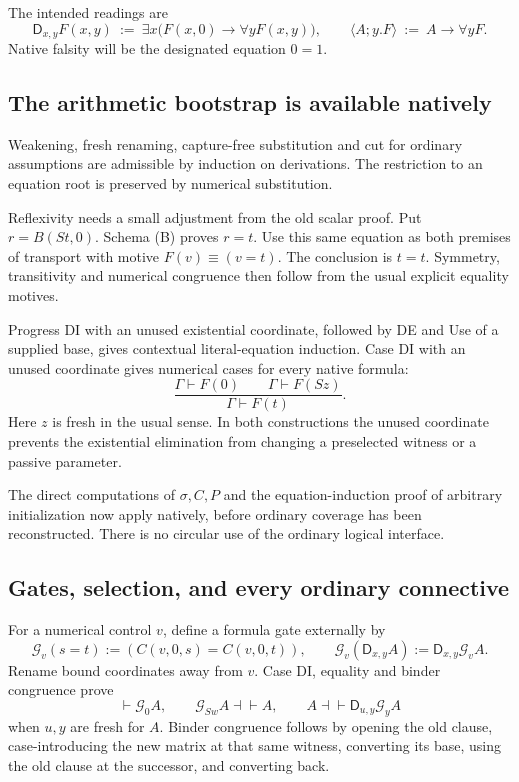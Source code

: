 \documentclass[11pt]{article}
\theoremstyle{definition}
\newcommand{\D}{\mathsf D}
\newcommand{\G}{\mathcal G}
\newcommand{\seq}{\vdash}
\begin{document}
The intended readings are
\[
 \D_{x,y}F(x,y)\ :=\
 \exists x\bigl(F(x,0)\to\forall yF(x,y)\bigr),
 \qquad
 \langle A;y.F\rangle\ :=\ A\to\forall yF.
\]
Native falsity will be the designated equation $0=1$.

\subsection{The arithmetic bootstrap is available natively}

Weakening, fresh renaming, capture-free substitution and cut for ordinary
assumptions are admissible by induction on derivations. The restriction
to an equation root is preserved by numerical substitution.

Reflexivity needs a small adjustment from the old scalar proof. Put
$r=B(St,0)$. Schema (B) proves $r=t$. Use this same equation as
both premises of transport with motive $F(v)\equiv(v=t)$. The
conclusion is $t=t$. Symmetry, transitivity and numerical congruence
then follow from the usual explicit equality motives.

Progress DI with an unused existential coordinate, followed by DE and
Use of a supplied base, gives contextual literal-equation induction.
Case DI with an unused coordinate gives numerical cases for every
native formula:
\[
 \frac{\Gamma\seq F(0)\qquad\Gamma\seq F(Sz)}
      {\Gamma\seq F(t)}.
 \tag{NC}\label{rule:NC}
\]
Here $z$ is fresh in the usual sense. In both constructions the unused
coordinate prevents the existential elimination from changing a
preselected witness or a passive parameter.

The direct computations of $\sigma,C,P$ and the equation-induction
proof of arbitrary initialization now apply natively, before ordinary
coverage has been reconstructed. There is no circular use of the
ordinary logical interface.

\subsection{Gates, selection, and every ordinary connective}

For a numerical control $v$, define a formula gate externally by
\[
 \G_v(s=t):=(C(v,0,s)=C(v,0,t)),\qquad
 \G_v(\D_{x,y}A):=\D_{x,y}\G_vA.
\]
Rename bound coordinates away from $v$. Case DI, equality and binder
congruence prove
\[
 \seq\G_0A,\qquad \G_{Sw}A\dashv\vdash A,
 \qquad A\dashv\vdash\D_{u,y}\G_yA
\]
when $u,y$ are fresh for $A$. Binder congruence follows by opening the
old clause, case-introducing the new matrix at that same witness,
converting its base, using the old clause at the successor, and
converting back.
\end{document}
